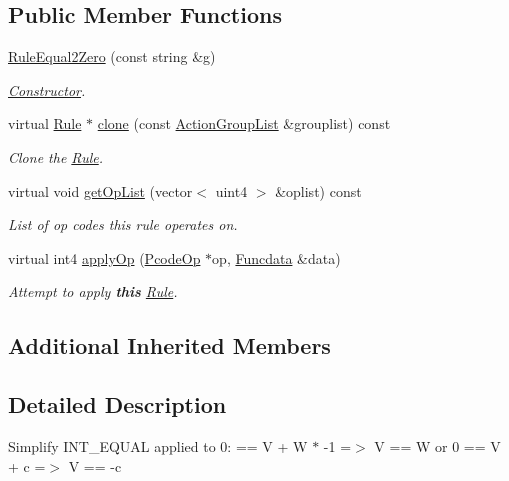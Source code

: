 \subsection*{Public Member Functions}
\begin{DoxyCompactItemize}
\item 
\mbox{\hyperlink{class_rule_equal2_zero_a2dabc21e58113908e57df8192cc1c26f}{Rule\+Equal2\+Zero}} (const string \&g)
\begin{DoxyCompactList}\small\item\em \mbox{\hyperlink{class_constructor}{Constructor}}. \end{DoxyCompactList}\item 
virtual \mbox{\hyperlink{class_rule}{Rule}} $\ast$ \mbox{\hyperlink{class_rule_equal2_zero_ac77dab90494d8a0d1ca81c6c5a2e0962}{clone}} (const \mbox{\hyperlink{class_action_group_list}{Action\+Group\+List}} \&grouplist) const
\begin{DoxyCompactList}\small\item\em Clone the \mbox{\hyperlink{class_rule}{Rule}}. \end{DoxyCompactList}\item 
virtual void \mbox{\hyperlink{class_rule_equal2_zero_a4a75bdf103127765317c10b1c3bb800f}{get\+Op\+List}} (vector$<$ uint4 $>$ \&oplist) const
\begin{DoxyCompactList}\small\item\em List of op codes this rule operates on. \end{DoxyCompactList}\item 
virtual int4 \mbox{\hyperlink{class_rule_equal2_zero_a4451f6e9c8236e504f80f6c57edda360}{apply\+Op}} (\mbox{\hyperlink{class_pcode_op}{Pcode\+Op}} $\ast$op, \mbox{\hyperlink{class_funcdata}{Funcdata}} \&data)
\begin{DoxyCompactList}\small\item\em Attempt to apply {\bfseries{this}} \mbox{\hyperlink{class_rule}{Rule}}. \end{DoxyCompactList}\end{DoxyCompactItemize}
\subsection*{Additional Inherited Members}


\subsection{Detailed Description}
Simplify I\+N\+T\+\_\+\+E\+Q\+U\+AL applied to 0\+: { == V + W $\ast$ -\/1 =$>$ V == W or 0 == V + c =$>$ V == -\/c} 

